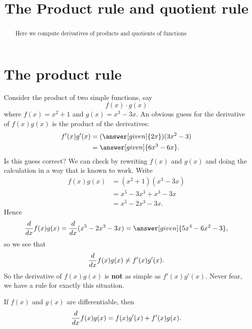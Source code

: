 \documentclass{ximera}
\title[Dig-In:]{The Product rule and quotient rule}
\begin{document}
\begin{abstract}
Here we compute derivatives of products and quotients of functions
\end{abstract}
\maketitle


\section{The product rule}


Consider the product of two simple functions, say
\[
f(x)\cdot g(x)
\]
where $f(x)=x^2+1$ and $g(x)=x^3-3x$. An obvious guess for the
derivative of $f(x)g(x)$ is the product of the derivatives:
\begin{align*}
f'(x)g'(x) &= (\answer[given]{2x})(3x^2-3)\\
&= \answer[given]{6x^3-6x}.
\end{align*}
Is this guess correct? We can check by rewriting $f(x)$
and $g(x)$ and doing the calculation in a way that is known to
work. Write 
\begin{align*}
f(x)g(x) &= (x^2+1)(x^3-3x)\\
&=x^5-3x^3+x^3-3x\\
&=x^5-2x^3-3x.
\end{align*} 
Hence
\[
\ddx f(x) g(x) = \ddx(x^5 - 2x^3 - 3x) = \answer[given]{5x^4-6x^2-3}, 
\]
so we see that 
\[
\frac{d}{dx} f(x) g(x) \ne  f'(x)g'(x).
\]
So the derivative of $f(x)g(x)$ is \textbf{not} as simple as
$f'(x)g'(x)$. Never fear, we have a rule for exactly this
situation.
\begin{theorem}\label{theorem:product-rule}
If $f(x)$ and $g(x)$ are differentiable, then
\[
\frac{d}{dx} f(x)g(x) = f(x)g'(x)+f'(x)g(x).
\]
\end{theorem}
\end{document}
